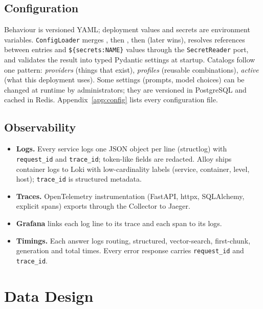 \documentclass[11pt,letterpaper]{report}
\begin{document}
\section{Configuration}
Behaviour is versioned YAML; deployment values and secrets are environment variables.
\texttt{ConfigLoader} merges , then , then
 (later wins), resolves references between entries and
\texttt{\$\{secrets:NAME\}} values through the \texttt{SecretReader} port, and validates the result into
typed Pydantic settings at startup. Catalogs follow one pattern:
\emph{providers} (things that exist), \emph{profiles} (reusable combinations), \emph{active}
(what this deployment uses). Some settings (prompts, model choices) can be changed at runtime by
administrators; they are versioned in PostgreSQL and cached in Redis. Appendix~\ref{app:config}
lists every configuration file.

\section{Observability}
\begin{itemize}
  \item \textbf{Logs.} Every service logs one JSON object per line (structlog) with \texttt{request\_id} and
        \texttt{trace\_id}; token-like fields are redacted. Alloy ships container logs to Loki with
        low-cardinality labels (service, container, level, host); \texttt{trace\_id} is structured metadata.
  \item \textbf{Traces.} OpenTelemetry instrumentation (FastAPI, httpx, SQLAlchemy, explicit spans) exports
        through the Collector to Jaeger.
  \item \textbf{Grafana} links each log line to its trace and each span to its logs.
  \item \textbf{Timings.} Each answer logs routing, structured, vector-search, first-chunk, generation and
        total times. Every error response carries \texttt{request\_id} and \texttt{trace\_id}.
\end{itemize}

\chapter{Data Design}\label{ch:data}
\end{document}
